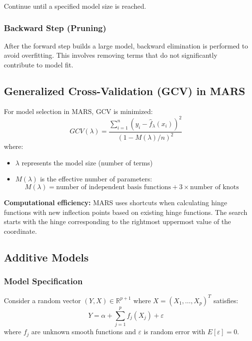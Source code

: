 \documentclass[12pt,a4paper]{article}
\begin{document}
Continue until a specified model size is reached.

\subsubsection{Backward Step (Pruning)}

After the forward step builds a large model, backward elimination is performed to avoid overfitting. This involves removing terms that do not significantly contribute to model fit.

\subsection{Generalized Cross-Validation (GCV) in MARS}

For model selection in MARS, GCV is minimized:
\begin{equation}
GCV(\lambda) = \frac{\sum_{i=1}^n (y_i - \hat{f}_\lambda(x_i))^2}{(1 - M(\lambda)/n)^2}
\end{equation}
where:
\begin{itemize}
    \item $\lambda$ represents the model size (number of terms)
    \item $M(\lambda)$ is the effective number of parameters:
    \begin{equation}
    M(\lambda) = \text{number of independent basis functions} + 3 \times \text{number of knots}
    \end{equation}
\end{itemize}

\textbf{Computational efficiency:} MARS uses shortcuts when calculating hinge functions with new inflection points based on existing hinge functions. The search starts with the hinge corresponding to the rightmost uppermost value of the coordinate.

\subsection{Additive Models}

\subsubsection{Model Specification}

Consider a random vector $(Y, X) \in \mathbb{R}^{p+1}$ where $X = (X_1, \ldots, X_p)^T$ satisfies:
\begin{equation}
Y = \alpha + \sum_{j=1}^p f_j(X_j) + \varepsilon
\end{equation}
where $f_j$ are unknown smooth functions and $\varepsilon$ is random error with $E[\varepsilon] = 0$.
\end{document}
